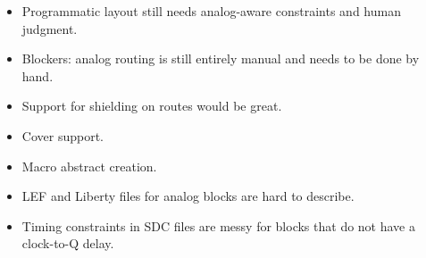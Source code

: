 \documentclass[aspectratio=169]{beamer}
\begin{document}
\begin{frame}
{\begin{itemize}
    \item Programmatic layout still needs analog-aware constraints and human judgment.
    \item Blockers: analog routing is still entirely manual and needs to be done by hand.
    \item Support for shielding on routes would be great.
    \item Cover support.
    \item Macro abstract creation.
    \item LEF and Liberty files for analog blocks are hard to describe.
    \item Timing constraints in SDC files are messy for blocks that do not have a clock-to-Q delay.
  \end{itemize}}
\end{frame}
\end{document}

